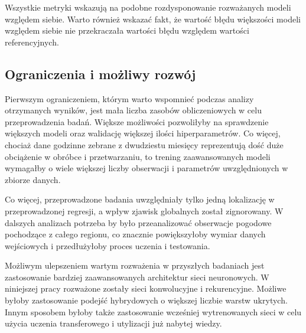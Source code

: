 Wszystkie metryki wskazują na podobne rozdysponowanie rozważanych modeli względem siebie. Warto również wskazać
fakt, że wartość błędu większości modeli względem siebie nie przekraczała wartości błędu względem wartości
referencyjnych.



\subsection{Ograniczenia i możliwy rozwój}

Pierwszym ograniczeniem, którym warto wspomnieć podczas analizy otrzymanych wyników, jest 
mała liczba zasobów obliczeniowych w celu przeprowadzenia badań. Większe możliwości pozwoliłyby
na sprawdzenie większych modeli oraz walidację większej ilości hiperparametrów. Co więcej, 
chociaż dane godzinne zebrane z dwudziestu miesięcy reprezentują dość duże obciążenie
w obróbce i przetwarzaniu, to trening zaawansowanych modeli wymagałby o wiele większej liczby 
obserwacji i parametrów uwzględnionych w zbiorze danych.

Co więcej, przeprowadzone badania uwzględniały tylko jedną lokalizację w przeprowadzonej regresji,
a wpływ zjawisk globalnych został zignorowany. W dalszych analizach potrzeba by było przeanalizować
obserwacje pogodowe pochodzące z całego regionu, co znacznie powiększyłoby wymiar danych wejściowych
i przedłużyłoby proces uczenia i testowania.

Możliwym ulepszeniem wartym rozważenia w przyszłych badaniach jest zastosowanie bardziej zaawansowanych
architektur sieci neuronowych. W niniejszej pracy rozważone zostały sieci konwolucyjne i rekurencyjne.
Możliwe byłoby zastosowanie podejść hybrydowych o większej liczbie warstw ukrytych. Innym sposobem
byłoby także zastosowanie wcześniej wytrenowanych sieci w celu użycia uczenia transferowego i utylizacji
już nabytej wiedzy.

